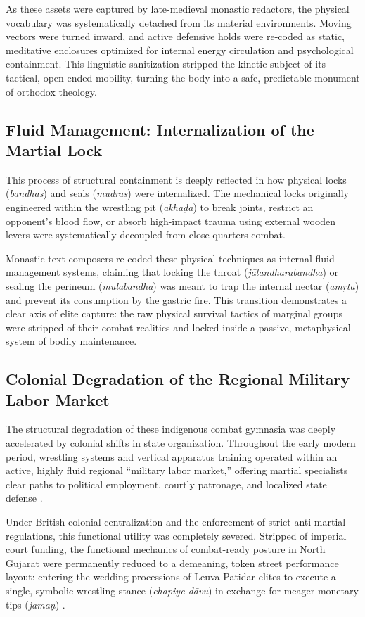 \documentclass[11pt,twoside,letterpaper]{article}
\begin{document}
As these assets were captured by late-medieval monastic redactors, the physical vocabulary was systematically detached from its material environments. Moving vectors were turned inward, and active defensive holds were re-coded as static, meditative enclosures optimized for internal energy circulation and psychological containment. This linguistic sanitization stripped the kinetic subject of its tactical, open-ended mobility, turning the body into a safe, predictable monument of orthodox theology.

\subsection{Fluid Management: Internalization of the Martial Lock}
This process of structural containment is deeply reflected in how physical locks (\textit{bandhas}) and seals (\textit{mudrās}) were internalized. The mechanical locks originally engineered within the wrestling pit (\textit{akhāḍā}) to break joints, restrict an opponent's blood flow, or absorb high-impact trauma using external wooden levers were systematically decoupled from close-quarters combat. 

Monastic text-composers re-coded these physical techniques as internal fluid management systems, claiming that locking the throat (\textit{jālandharabandha}) or sealing the perineum (\textit{mūlabandha}) was meant to trap the internal nectar (\textit{amṛta}) and prevent its consumption by the gastric fire. This transition demonstrates a clear axis of elite capture: the raw physical survival tactics of marginal groups were stripped of their combat realities and locked inside a passive, metaphysical system of bodily maintenance.

\subsection{Colonial Degradation of the Regional Military Labor Market}
The structural degradation of these indigenous combat gymnasia was deeply accelerated by colonial shifts in state organization. Throughout the early modern period, wrestling systems and vertical apparatus training operated within an active, highly fluid regional ``military labor market,'' offering martial specialists clear paths to political employment, courtly patronage, and localized state defense \citep{Thomas2025}. 

Under British colonial centralization and the enforcement of strict anti-martial regulations, this functional utility was completely severed. Stripped of imperial court funding, the functional mechanics of combat-ready posture in North Gujarat were permanently reduced to a demeaning, token street performance layout: entering the wedding processions of Leuva Patidar elites to execute a single, symbolic wrestling stance (\textit{chapiye dāvu}) in exchange for meager monetary tips (\textit{jamaṇ}) \citep{Sandesara1948}. 
\end{document}
